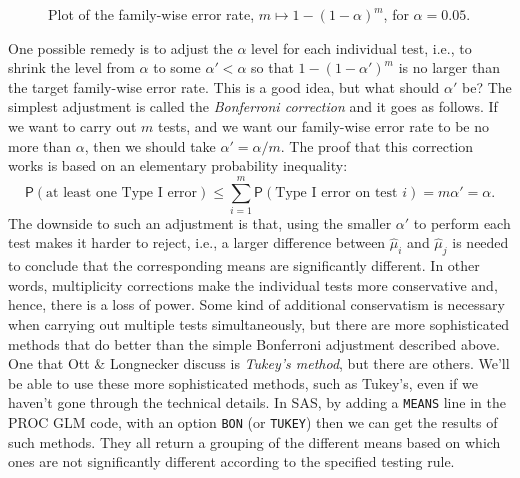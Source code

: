 \documentclass[a4paper, 12pt]{article}
\theoremstyle{plain}
\theoremstyle{definition}
\theoremstyle{remark}
\newcommand{\prob}{\mathsf{P}}
\begin{document}
\begin{figure}[t]
\begin{center}
\end{center}
\caption{Plot of the family-wise error rate, $m \mapsto 1-(1-\alpha)^m$, for $\alpha=0.05$.}
\label{fig:fwer}
\end{figure}

One possible remedy is to adjust the $\alpha$ level for each individual test, i.e., to shrink the level from $\alpha$ to some $\alpha' < \alpha$ so that $1-(1-\alpha')^m$ is no larger than the target family-wise error rate.  This is a good idea, but what should $\alpha'$ be?  The simplest adjustment is called the {\em Bonferroni correction} and it goes as follows.  If we want to carry out $m$ tests, and we want our family-wise error rate to be no more than $\alpha$, then we should take $\alpha' = \alpha / m$.  The proof that this correction works is based on an elementary probability inequality:
\[ \prob(\text{at least one Type~I error}) \leq \sum_{i=1}^m \prob(\text{Type I error on test $i$}) = m\alpha' = \alpha. \]
The downside to such an adjustment is that, using the smaller $\alpha'$ to perform each test makes it harder to reject, i.e., a larger difference between $\hat\mu_i$ and $\hat\mu_j$ is needed to conclude that the corresponding means are significantly different.  In other words, multiplicity corrections make the individual tests more conservative and, hence, there is a loss of power.  Some kind of additional conservatism is necessary when carrying out multiple tests simultaneously, but there are more sophisticated methods that do better than the simple Bonferroni adjustment described above.  One that Ott \& Longnecker discuss is {\em Tukey's method}, but there are others.  We'll be able to use these more sophisticated methods, such as Tukey's, even if we haven't gone through the technical details.  In SAS, by adding a {\tt MEANS} line in the PROC GLM code, with an option {\tt BON} (or {\tt TUKEY}) then we can get the results of such methods.  They all return a grouping of the different means based on which ones are not significantly different according to the specified testing rule.  
\end{document}
